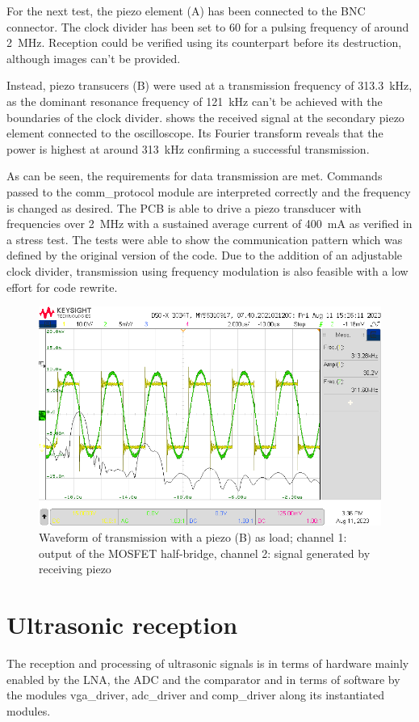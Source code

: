 \documentclass[
	english,
	ruledheaders=section, %
	class=report,%
	thesis={type=Project Seminar Report},%
	accentcolor=TUDa-1d, %
	custommargins=false,%
	marginpar=false,%
	parskip=half-,%
	fontsize=11pt,%
]{tudapub}
\begin{document}
For the next test, the piezo element (A) has been connected to the BNC connector. The clock divider has been set to 60 for a pulsing frequency of around \SI{2}{\mega\hertz}. Reception could be verified using its counterpart before its destruction, although images can't be provided.

Instead, piezo transucers (B) were used at a transmission frequency of \SI{313.3}{\kilo\hertz}, as the dominant resonance frequency of \SI{121}{\kilo\hertz} can't be achieved with the boundaries of the clock divider.  shows the received signal at the secondary piezo element connected to the oscilloscope. Its Fourier transform reveals that the power is highest at around \SI{313}{\kilo\hertz} confirming a successful transmission.

As can be seen, the requirements for data transmission are met. Commands passed to the comm\_protocol module are interpreted correctly and the frequency is changed as desired. The \gls{PCB} is able to drive a piezo transducer with frequencies over \SI{2}{\mega\hertz} with a sustained average current of \SI{400}{\milli\ampere} as verified in a stress test. The tests were able to show the communication pattern which was defined by the original version of the code. Due to the addition of an adjustable clock divider, transmission using frequency modulation is also feasible with a low effort for code rewrite.


\begin{figure}[H]
    \centering
    \includegraphics[width=0.8\columnwidth]{images/piezo_belastet4.png}
    \caption{Waveform of transmission with a piezo (B) as load; channel 1: output of the MOSFET half-bridge, channel 2: signal generated by receiving piezo}
    \label{img:piezo_belastet4}
\end{figure}

\section{Ultrasonic reception}
The reception and processing of ultrasonic signals is in terms of hardware mainly enabled by the \gls{LNA}, the \gls{ADC} and the comparator and in terms of software by the modules vga\_driver, adc\_driver and comp\_driver along its instantiated modules.
\end{document}
